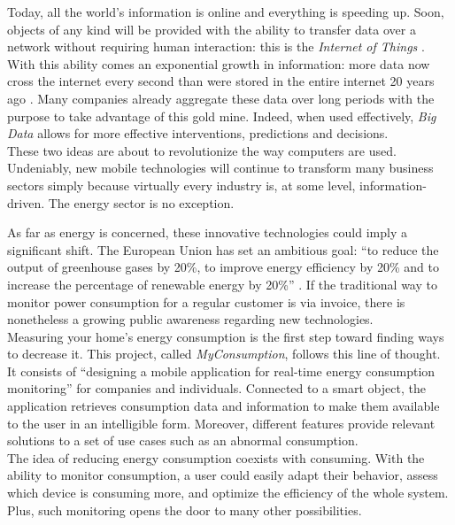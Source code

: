 \documentclass[a4paper, oneside, 11pt]{book}
\begin{document}
Today, all the world's information is online and everything is speeding up. Soon, objects of any kind will be provided with the ability to transfer data over a network without requiring human interaction: this is the \emph{Internet of Things} \cite{WhatIs:online}. With this ability comes an exponential growth in information: more data now cross the internet every second than were stored in the entire internet 20 years ago \cite{bigdata:article}. Many companies already aggregate these data over long periods with the purpose to take advantage of this gold mine. Indeed, when used effectively, \emph{Big Data} allows for more effective interventions, predictions and decisions.\\

These two ideas are about to revolutionize the way computers are used. Undeniably, new mobile technologies will continue to transform many business sectors simply because virtually every industry is, at some level, information-driven. The energy sector is no exception.

As far as energy is concerned, these innovative technologies could imply a significant shift. The European Union has set an ambitious goal: “to reduce the output of greenhouse gases by 20\%, to improve energy efficiency by 20\% and to increase the percentage of renewable energy by 20\%” \cite{europe:article}. If the traditional way to monitor power consumption for a regular customer is via invoice, there is nonetheless a growing public awareness regarding new technologies.\\

Measuring your home's energy consumption is the first step toward finding ways to decrease it. This project, called \textit{MyConsumption}, follows this line of thought. It consists of “designing a mobile application for real-time energy consumption monitoring” for companies and individuals. Connected to a smart object, the application retrieves consumption data and information to make them available to the user in an intelligible form. Moreover, different features provide relevant solutions to a set of use cases such as an abnormal consumption.\\

The idea of reducing energy consumption coexists with consuming. With the ability to monitor consumption, a user could easily adapt their behavior, assess which device is consuming more, and optimize the efficiency of the whole system. Plus, such monitoring opens the door to many other possibilities.\\
\end{document}
